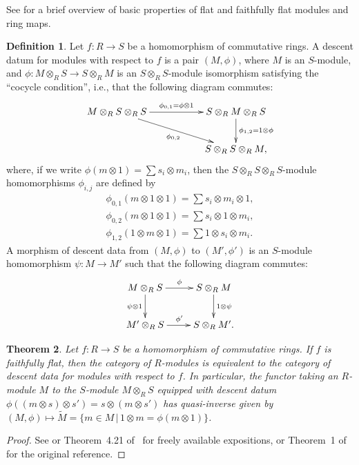 \documentclass[11pt]{article}
\newtheorem{thm}{Theorem}[section]
\theoremstyle{definition}
\newtheorem{defn}[thm]{Definition}
\begin{document}
See \cite[\href{https://stacks.math.columbia.edu/tag/00H9}{Section~00H9}]{Stacks} for a brief overview of basic properties of flat and faithfully flat modules and ring maps.

\begin{defn} \label{defn:descent-datum-for-modules}
Let $f\colon R \to S$ be a homomorphism of commutative rings. A descent datum for modules with respect to $f$ is a pair $(M, \phi)$, where $M$ is an $S$-module, and $\phi\colon M \otimes_{R} S \to S \otimes_{R} M$ is an $S \otimes_{R} S$-module isomorphism satisfying the ``cocycle condition'', i.e., that the following diagram commutes:
\begin{gather*} \xymatrix{ M \otimes_{R} S \otimes_{R} S \ar[rr]^{\phi_{0,1} = \phi \otimes 1} \ar[rrd]_{\phi_{0,2}} & & S \otimes_{R} M \otimes_{R} S \ar[d]^{\phi_{1,2} = 1 \otimes \phi} \\ & & S \otimes_{R} S \otimes_{R} M,} \end{gather*}
where, if we write $\phi(m \otimes 1) = \sum s_i \otimes m_i$, then the $S \otimes_{R} S \otimes_{R} S$-module homomorphisms $\phi_{i,j}$ are defined by
\begin{gather*}
\phi_{0,1}(m \otimes 1 \otimes 1) = \sum s_i \otimes m_i \otimes 1, \\
\phi_{0,2}(m \otimes 1 \otimes 1) = \sum s_i \otimes 1 \otimes m_i, \\
\phi_{1,2}(1 \otimes m \otimes 1) = \sum 1 \otimes s_i \otimes m_i.
\end{gather*}
A morphism of descent data from $(M, \phi)$ to $(M', \phi')$ is an $S$-module homomorphism $\psi\colon M \to M'$ such that the following diagram commutes:
\begin{gather*} \xymatrix{ M \otimes_{R} S \ar[r]^{\phi} \ar[d]_{\psi \otimes 1} & S \otimes_{R} M \ar[d]^{1 \otimes \psi} \\
M' \otimes_{R} S \ar[r]^{\phi'} & S \otimes_{R} M'. } \end{gather*}
\end{defn}

\begin{thm} \label{thm:descent-for-modules}
Let $f\colon R \to S$ be a homomorphism of commutative rings. If $f$ is faithfully flat, then the category of $R$-modules is equivalent to the category of descent data for modules with respect to $f$. In particular, the functor taking an $R$-module $M$ to the $S$-module $M \otimes_{R} S$ equipped with descent datum $\phi((m \otimes s) \otimes s') = s \otimes (m \otimes s')$ has quasi-inverse given by $(M, \phi) \mapsto \tilde{M} = \{m\in M \,|\, 1 \otimes m = \phi(m \otimes 1)\}$.
\end{thm}
\begin{proof}
See \cite[\href{https://stacks.math.columbia.edu/tag/023N}{Proposition 023N}]{Stacks} or Theorem~4.21 of~\cite{V05} for freely available expositions, or Theorem~1 of~\cite{G59} for the original reference.
\end{proof}
\end{document}
